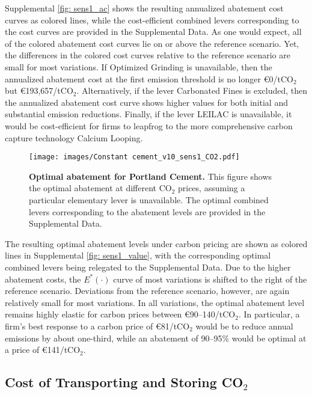 \documentclass[12pt, a4paper]{article} %
\newcommand{\Suppl}{Supplemental}
\begin{document}
\Suppl$ $ \autoref{fig: sens1_ac} shows the resulting annualized abatement cost curves as colored lines, while the cost-efficient combined levers corresponding to the cost curves are provided in the \Suppl$ $ Data. As one would expect, all of the colored abatement cost curves lie on or above the reference scenario. Yet, the differences in the colored cost curves relative to the reference scenario are small for most variations. If Optimized Grinding is unavailable, then the annualized abatement cost at the first emission threshold is no longer \euro 0/tCO$_2$ but \euro 193,657/tCO$_2$. Alternatively, if the lever Carbonated Fines is excluded, then the annualized abatement cost curve shows higher values for both initial and substantial emission reductions. Finally, if the lever LEILAC is unavailable, it would be cost-efficient for firms to leapfrog to the more comprehensive carbon capture technology Calcium Looping.

\begin{figure}[ht]
\centering
\texttt{[image: images/Constant cement\_v10\_sens1\_CO2.pdf]}
\caption{\textbf{Optimal abatement for Portland Cement.} This figure shows the optimal abatement at different CO$_2$ prices, assuming a particular elementary lever is unavailable. The optimal combined levers corresponding to the abatement levels are provided in the \Suppl$ $ Data.}
\label{fig: sens1_value}
\end{figure}

The resulting optimal abatement levels under carbon pricing are shown as colored lines in \Suppl$ $ \autoref{fig: sens1_value}, with the corresponding optimal combined levers being relegated to the \Suppl$ $ Data. Due to the higher abatement costs, the $E^*(\cdot)$ curve of most variations is shifted to the right of the reference scenario. Deviations from the reference scenario, however, are again relatively small for most variations. In all variations, the optimal abatement level remains highly elastic for carbon prices between \euro 90--140/tCO$_2$. In particular, a firm's best response to a carbon price of \euro 81/tCO$_2$ would be to reduce annual emissions by about one-third, while an abatement of 90--95\% would be optimal at a price of \euro 141/tCO$_2$.


\newpage
\subsection{Cost of Transporting and Storing CO$_2$}
\label{sec: sn-co2}
\end{document}
